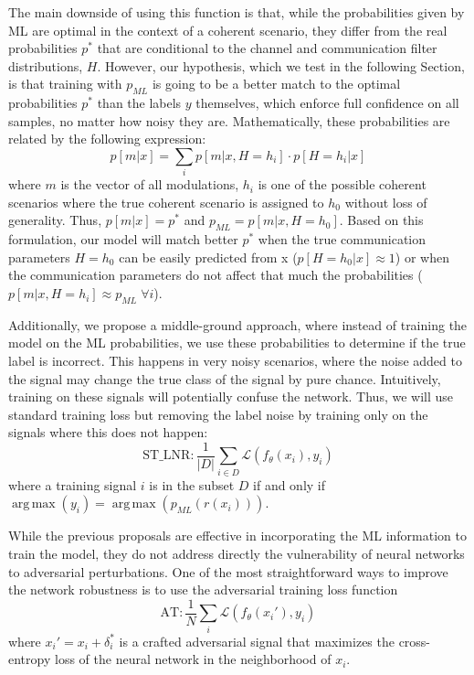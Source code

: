 \documentclass[conference]{IEEEtran}
\newcommand{\Ls}{\mathcal{L}}
\DeclareMathOperator*{\argmax}{arg\,max}
\begin{document}
The main downside of using this function is that, while the probabilities given by ML are optimal in the context of a coherent scenario, they differ from the real probabilities $p^{*}$ that are conditional to the channel and communication filter distributions, $H$. However, our hypothesis, which we test in the following Section, is that training with $p_{ML}$ is going to be a better match to the optimal probabilities $p^{*}$ than the labels $y$ themselves, which enforce full confidence on all samples, no matter how noisy they are. Mathematically, these probabilities are related by the following expression:
\begin{equation}
	p[m|x] =  \sum_i p[m|x,H=h_i] \cdot p[H=h_i|x]
\end{equation}
where $m$ is the vector of all modulations, $h_i$ is one of the possible coherent scenarios where the true coherent scenario is assigned to $h_0$ without loss of generality. Thus, $p[m|x] = p^{*}$ and $p_{ML} = p[m|x,H=h_0]$. Based on this formulation, our model will match better $p^{*}$ when the true communication parameters $H=h_0$ can be easily predicted from x ($p[H=h_0|x] \approx 1$) or when the communication parameters do not affect that much the probabilities ($p[m|x,H=h_i] \approx p_{ML} \; \forall i$).

Additionally, we propose a middle-ground approach, where instead of training the model on the ML probabilities, we use these probabilities to determine if the true label is incorrect. This happens in very noisy scenarios, where the noise added to the signal may change the true class of the signal by pure chance. Intuitively, training on these signals will potentially confuse the network. Thus, we will use standard training loss but removing the label noise by training only on the signals where this does not happen:
\begin{equation}
    \text{ST\_LNR} : \dfrac{1}{|D|}\sum_{i \in D}\Ls(f_{\theta}(x_i), y_i)
\end{equation}
where a training signal $i$ is in the subset $D$ if and only if $\argmax(y_i) = \argmax(p_{ML}(r(x_i)))$.

While the previous proposals are effective in incorporating the ML information to train the model, they do not address directly the vulnerability of neural networks to adversarial perturbations. One of the most straightforward ways to improve the network robustness is to use the adversarial training loss function
\begin{equation}
    \text{AT} : \dfrac{1}{N}\sum_{i}\Ls(f_{\theta}(x_i'), y_i)
\end{equation}
where $x_i' = x_i + \delta_i^*$ is a crafted adversarial signal that maximizes the cross-entropy loss of the neural network in the neighborhood of $x_i$.
\end{document}
